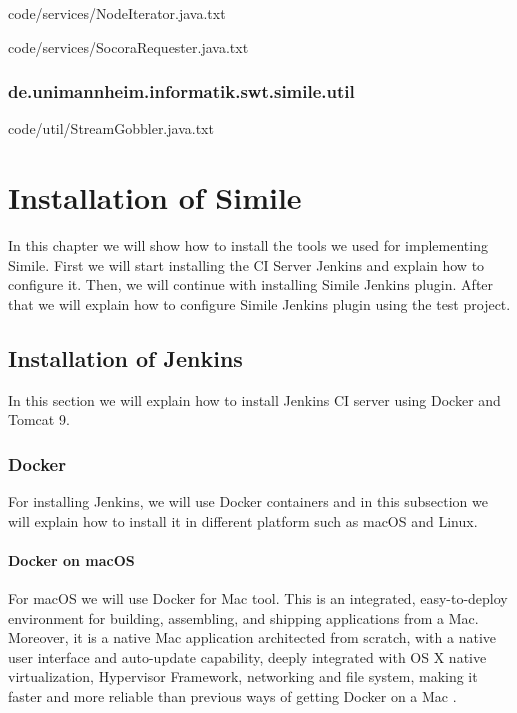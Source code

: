 
{code/services/NodeIterator.java.txt}


{code/services/SocoraRequester.java.txt}
\subsection{de.unimannheim.informatik.swt.simile.util}

{code/util/StreamGobbler.java.txt}

\chapter{Installation of Simile}
In this chapter we will show how to install the tools we used for implementing Simile. First we will start installing the CI Server Jenkins and explain how to configure it. Then, we will continue with installing Simile Jenkins plugin. After that we will explain how to configure Simile Jenkins plugin using the test project.

\section{Installation of Jenkins}
In this section we will explain how to install Jenkins CI server using Docker and Tomcat 9.

\subsection{Docker}
For installing Jenkins, we will use Docker containers and in this subsection we will explain how to install it in different platform such as macOS and Linux.

\subsubsection{Docker on macOS}
For macOS we will use Docker for Mac tool. This is an integrated, easy-to-deploy environment for building, assembling, and shipping applications from a Mac. Moreover, it is a native Mac application architected from scratch, with a native user interface and auto-update capability, deeply integrated with OS X native virtualization, Hypervisor Framework, networking and file system, making it faster and more reliable than previous ways of getting Docker on a Mac \cite{Docker}.


